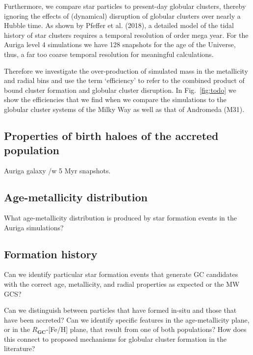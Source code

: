 \documentclass[a4paper,fleqn,usenatbib]{mnras}
\begin{document}
Furthermore, we compare star particles to present-day globular clusters, thereby
ignoring the effects of (dynamical) disruption of globular clusters over nearly
a Hubble time. As shown by Pfeffer et al. (2018), a detailed model of the tidal
history of star clusters requires a temporal resolution of order mega year. For
the Auriga level 4 simulations we have 128 snapshots for the age of the Universe,
thus, a far too coarse temporal resolution for meaningful calculations.

Therefore we investigate the over-production of simulated mass in the metallicity
and radial bins and use the term `efficiency' to refer to the combined product
of bound cluster formation and globular cluster disruption. In Fig.~\ref{fig:todo} 
we show the efficiencies that we find when we compare the simulations to the 
globular cluster systems of the Milky Way as well as that of Andromeda (M31).



\subsection{Properties of birth haloes of the accreted population}
\label{sec:birth-properties-of-accreted-gc-candidates}

Auriga galaxy /w 5 Myr snapshots.



\subsection{Age-metallicity distribution}
\label{sec:agemetallicity}
What age-metallicity distribution is produced by star formation events in the Auriga simulations?


\subsection{Formation history} 
\label{sec:history}
Can we identify particular star formation events that generate GC candidates with the correct age, metallicity, and radial properties as expected or the MW GCS?

Can we distinguish between particles that have formed in-situ and those that have been accreted? Can we identify specific features in the age-metallicity plane, or in the $R_\textbf{GC}$-[Fe/H] plane, that result from one of both populations? How does this connect to proposed mechanisms for globular cluster formation in the literature?
\end{document}
